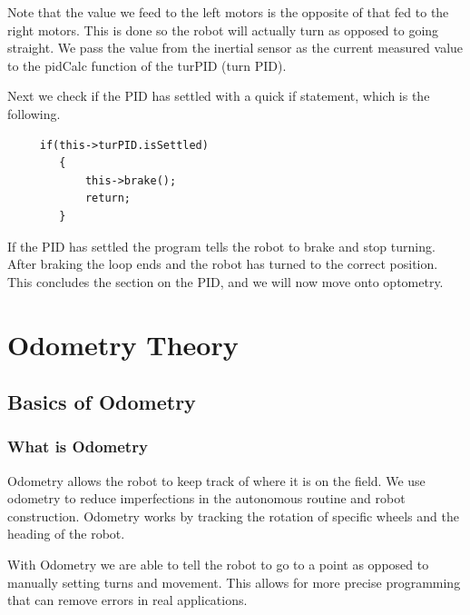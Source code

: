 \documentclass[12pt]{report}
\begin{document}
    Note that the value we feed to the left motors is the opposite of that fed to the right motors.
    This is done so the robot will actually turn as opposed to going straight.
    We pass the value from the inertial sensor as the current measured value to the pidCalc function of the turPID (turn PID).

    Next we check if the PID has settled with a quick if statement, which is the following.
    \begin{verbatim}
     if(this->turPID.isSettled)
        {
            this->brake();
            return;
        }
    \end{verbatim}

    If the PID has settled the program tells the robot to brake and stop turning.
    After braking the loop ends and the robot has turned to the correct position.
    This concludes the section on the PID, and we will now move onto optometry.


\pagebreak
\chapter{Odometry Theory}

\section{Basics of Odometry}
\subsection{What is Odometry}
    Odometry allows the robot to keep track of where it is on the field.
    We use odometry to reduce imperfections in the autonomous routine and robot construction.
    Odometry works by tracking the rotation of specific wheels and the heading of the robot.

    With Odometry we are able to tell the robot to go to a point as opposed to manually setting turns and movement.
    This allows for more precise programming that can remove errors in real applications.
\end{document}

